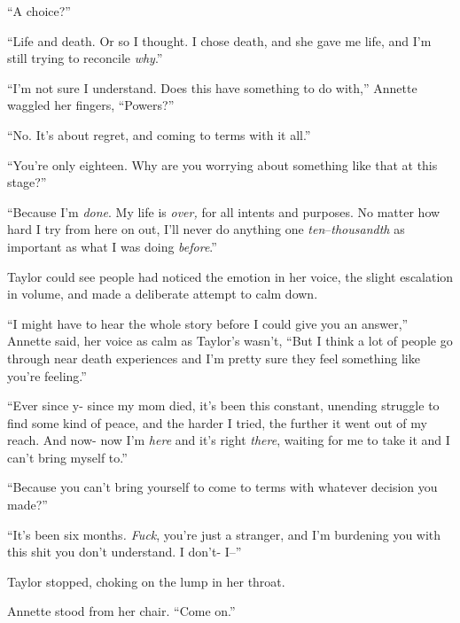 ``A choice?''



``Life and death.  Or so I thought.  I chose death, and she gave me life, and I'm still trying to reconcile \emph{why}.''



``I'm not sure I understand.  Does this have something to do with,'' Annette waggled her fingers, ``Powers?''



``No.  It's about regret, and coming to terms with it all.''



``You're only eighteen.  Why are you worrying about something like that at this stage?''



``Because I'm \emph{done}.  My life is \emph{over, }for all intents and purposes.  No matter how hard I try from here on out, I'll never do anything one \emph{ten}–\emph{thousandth} as important as what I was doing \emph{before}.''



Taylor could see people had noticed the emotion in her voice, the slight escalation in volume, and made a deliberate attempt to calm down.



``I might have to hear the whole story before I could give you an answer,'' Annette said, her voice as calm as Taylor's wasn't, ``But I think a lot of people go through near death experiences and I'm pretty sure they feel something like you're feeling.''



``Ever since y- since my mom died, it's been this constant, unending struggle to find some kind of peace, and the harder I tried, the further it went out of my reach.  And now- now I'm \emph{here} and it's right \emph{there}, waiting for me to take it and I can't bring myself to.''



``Because you can't bring yourself to come to terms with whatever decision you made?''



``It's been six months\emph{.  Fuck}, you're just a stranger, and I'm burdening you with this shit you don't understand.  I don't- I--''



Taylor stopped, choking on the lump in her throat.



Annette stood from her chair.  ``Come on.''



